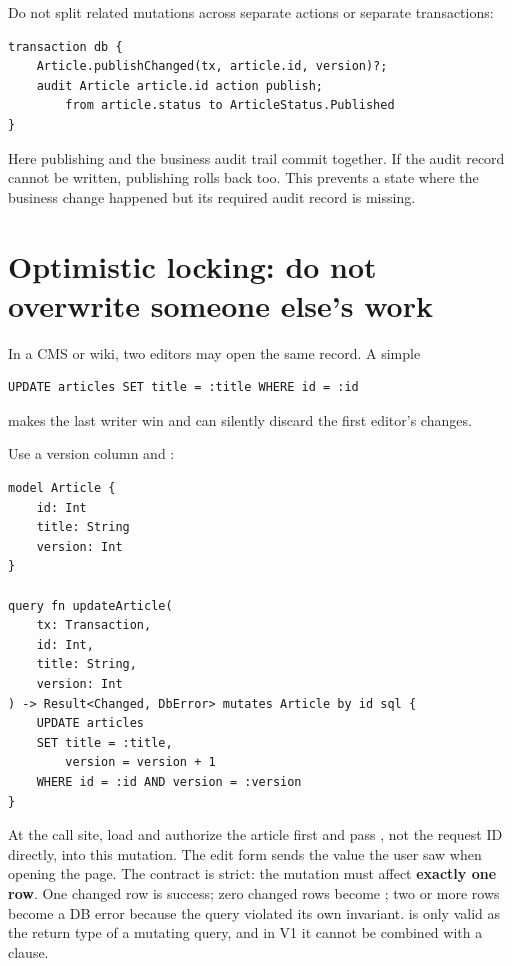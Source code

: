Do not split related mutations across separate actions or separate transactions:

\begin{lstlisting}[language=RWLang]
transaction db {
    Article.publishChanged(tx, article.id, version)?;
    audit Article article.id action publish;
        from article.status to ArticleStatus.Published
}
\end{lstlisting}

Here publishing and the business audit trail commit together. If the audit record cannot be written, publishing rolls back too. This prevents a state where the business change happened but its required audit record is missing.

\section{Optimistic locking: do not overwrite someone else's work}

In a CMS or wiki, two editors may open the same record. A simple

\begin{lstlisting}
UPDATE articles SET title = :title WHERE id = :id
\end{lstlisting}

makes the last writer win and can silently discard the first editor's changes.

Use a version column and :

\begin{lstlisting}[language=RWLang]
model Article {
    id: Int
    title: String
    version: Int
}

query fn updateArticle(
    tx: Transaction,
    id: Int,
    title: String,
    version: Int
) -> Result<Changed, DbError> mutates Article by id sql {
    UPDATE articles
    SET title = :title,
        version = version + 1
    WHERE id = :id AND version = :version
}
\end{lstlisting}

At the call site, load and authorize the article first and pass , not the request ID directly, into this mutation. The edit form sends the  value the user saw when opening the page. The  contract is strict: the mutation must affect \textbf{exactly one row}. One changed row is success; zero changed rows become ; two or more rows become a DB error because the query violated its own invariant.  is only valid as the return type of a mutating query, and in V1 it cannot be combined with a  clause.

